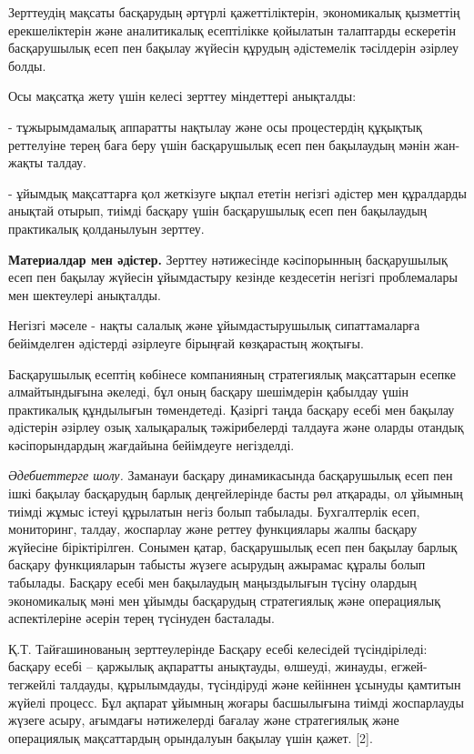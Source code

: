 \begin{multicols}{2}
Зерттеудің мақсаты басқарудың әртүрлі қажеттіліктерін, экономикалық
қызметтің ерекшеліктерін және аналитикалық есептілікке қойылатын
талаптарды ескеретін басқарушылық есеп пен бақылау жүйесін құрудың
әдістемелік тәсілдерін әзірлеу болды.

Осы мақсатқа жету үшін келесі зерттеу міндеттері анықталды:

- тұжырымдамалық аппаратты нақтылау және осы процестердің құқықтық
реттелуіне терең баға беру үшін басқарушылық есеп пен бақылаудың мәнін
жан-жақты талдау.

- ұйымдық мақсаттарға қол жеткізуге ықпал ететін негізгі әдістер мен
құралдарды анықтай отырып, тиімді басқару үшін басқарушылық есеп пен
бақылаудың практикалық қолданылуын зерттеу.

{\bfseries Материалдар мен әдістер.} Зерттеу нәтижесінде кәсіпорынның
басқарушылық есеп пен бақылау жүйесін ұйымдастыру кезінде кездесетін
негізгі проблемалары мен шектеулері анықталды.

Негізгі мәселе - нақты салалық және ұйымдастырушылық сипаттамаларға
бейімделген әдістерді әзірлеуге бірыңғай көзқарастың жоқтығы.

Басқарушылық есептің көбінесе компанияның стратегиялық мақсаттарын
есепке алмайтындығына әкеледі, бұл оның басқару шешімдерін қабылдау үшін
практикалық құндылығын төмендетеді. Қазіргі таңда басқару есебі мен
бақылау әдістерін әзірлеу озық халықаралық тәжірибелерді талдауға және
оларды отандық кәсіпорындардың жағдайына бейімдеуге негізделді.

\emph{Әдебиеттерге шолу.} Заманауи басқару динамикасында басқарушылық
есеп пен ішкі бақылау басқарудың барлық деңгейлерінде басты рөл
атқарады, ол ұйымның тиімді жұмыс істеуі құрылатын негіз болып табылады.
Бухгалтерлік есеп, мониторинг, талдау, жоспарлау және реттеу функциялары
жалпы басқару жүйесіне біріктірілген. Сонымен қатар, басқарушылық есеп
пен бақылау барлық басқару функцияларын табысты жүзеге асырудың ажырамас
құралы болып табылады. Басқару есебі мен бақылаудың маңыздылығын түсіну
олардың экономикалық мәні мен ұйымды басқарудың стратегиялық және
операциялық аспектілеріне әсерін терең түсінуден басталады.

Қ.Т. Тайғашинованың зерттеулерінде Басқару есебі келесідей
түсіндіріледі: басқару есебі -- қаржылық ақпаратты анықтауды, өлшеуді,
жинауды, егжей-тегжейлі талдауды, құрылымдауды, түсіндіруді және
кейіннен ұсынуды қамтитын жүйелі процесс. Бұл ақпарат ұйымның жоғары
басшылығына тиімді жоспарлауды жүзеге асыру, ағымдағы нәтижелерді
бағалау және стратегиялық және операциялық мақсаттардың орындалуын
бақылау үшін қажет. {[}2{]}.


\end{multicols}
